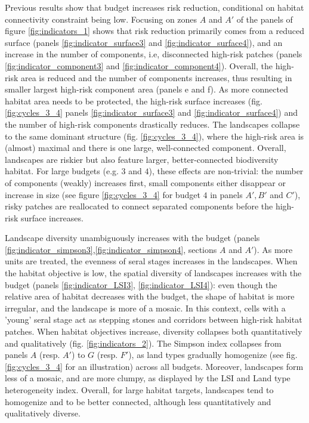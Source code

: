 Previous results show that budget increases risk reduction, conditional on habitat connectivity constraint being low. Focusing on zones $A$ and $A'$ of the panels of figure \ref{fig:indicators_1} shows that risk reduction primarily comes from a reduced surface (panels \ref{fig:indicator_surface3} and \ref{fig:indicator_surface4}), and an increase in the number of components, i.e, disconnected high-risk patches (panels \ref{fig:indicator_component3} and \ref{fig:indicator_component4}). Overall, the high-risk area is reduced and the number of components increases, thus resulting in smaller largest high-risk component area (panels e and f). As more connected habitat area needs to be protected, the high-risk surface increases (fig. \ref{fig:cycles_3_4} panels \ref{fig:indicator_surface3} and \ref{fig:indicator_surface4}) and the number of high-risk components drastically reduces. The landscapes collapse to the same dominant structure (fig. \ref{fig:cycles_3_4}), where the high-risk area is (almost) maximal and there is one large, well-connected component.  Overall, landscapes are riskier but also feature larger, better-connected biodiversity habitat. For large budgets (e.g. $3$ and $4$), these effects are non-trivial: the number of components (weakly) increases first, small components either disappear or increase in size (see figure \ref{fig:cycles_3_4} for budget $4$ in panels $A', B'$ and $C'$), risky patches are reallocated to connect separated components before the high-risk surface increases. 

Landscape diversity unambiguously increases with the budget (panels \ref{fig:indicator_simpson3},\ref{fig:indicator_simpson4}, sections $A$ and $A'$). As more units are treated, the evenness of seral stages increases in the landscapes. When the habitat objective is low, the spatial diversity of landscapes increases with the budget (panels \ref{fig:indicator_LSI3}, \ref{fig:indicator_LSI4}): even though the relative area of habitat decreases with the budget, the shape of habitat is more irregular, and the landscape is more of a mosaic. In this context, cells with a 'young' seral stage act as stepping stones and corridors between high-risk habitat patches. When habitat objectives increase, diversity collapses both quantitatively and qualitatively (fig. \ref{fig:indicators_2}). The Simpson index collapses from panels $A$ (resp. $A'$) to $G$ (resp. $F'$), as land types gradually homogenize (see fig. \ref{fig:cycles_3_4} for an illustration) across all budgets. Moreover, landscapes form less of a mosaic, and are more clumpy, as displayed by the LSI and Land type heterogeneity index. Overall, for large habitat targets, landscapes tend to homogenize and to be better connected, although less quantitatively and qualitatively diverse. 

